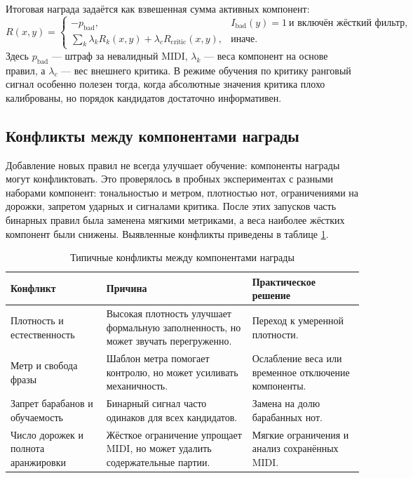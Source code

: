 \documentclass[a4paper,12pt]{extarticle}
\begin{document}
Итоговая награда задаётся как взвешенная сумма активных компонент:
\[
R(x,y)=
\begin{cases}
-p_{\mathrm{bad}}, & I_{\mathrm{bad}}(y)=1 \ \text{и включён жёсткий фильтр},\\
\sum_k \lambda_k R_k(x,y)+\lambda_c R_{\mathrm{critic}}(x,y), & \text{иначе}.
\end{cases}
\]
Здесь $p_{\mathrm{bad}}$ --- штраф за невалидный MIDI, $\lambda_k$ ---
веса компонент на основе правил, а $\lambda_c$ --- вес внешнего критика. В
режиме обучения по критику ранговый сигнал особенно полезен тогда, когда
абсолютные значения критика плохо калиброваны, но порядок кандидатов
достаточно информативен.

\subsection{Конфликты между компонентами награды}

Добавление новых правил не всегда улучшает обучение: компоненты награды могут
конфликтовать. Это проверялось в пробных экспериментах с разными наборами
компонент: тональностью и метром, плотностью нот, ограничениями на дорожки,
запретом ударных и сигналами критика. После этих запусков часть бинарных
правил была заменена мягкими метриками, а веса наиболее жёстких компонент
были снижены. Выявленные конфликты приведены в таблице
\ref{tab:reward_conflicts}.

\begin{table}[ht]
\centering
\caption{Типичные конфликты между компонентами награды}
\label{tab:reward_conflicts}
\begin{tabular}{|p{}|p{}|p{}|}
\hline
\textbf{Конфликт} & \textbf{Причина} & \textbf{Практическое решение} \\
\hline
Плотность и естественность & Высокая плотность улучшает формальную заполненность, но может звучать перегруженно. & Переход к умеренной плотности. \\
\hline
Метр и свобода фразы & Шаблон метра помогает контролю, но может усиливать механичность. & Ослабление веса или временное отключение компоненты. \\
\hline
Запрет барабанов и обучаемость & Бинарный сигнал часто одинаков для всех кандидатов. & Замена на долю барабанных нот. \\
\hline
Число дорожек и полнота аранжировки & Жёсткое ограничение упрощает MIDI, но может удалить содержательные партии. & Мягкие ограничения и анализ сохранённых MIDI. \\
\hline
\end{tabular}
\end{table}
\end{document}
